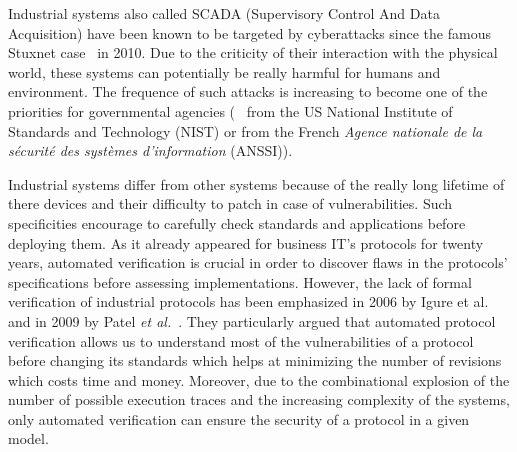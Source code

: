 Industrial systems also called SCADA (Supervisory Control And Data
Acquisition) have been known to be targeted by cyberattacks since the
famous Stuxnet case~\cite{Lan11} in 2010.  Due to the criticity of
their interaction with the physical world, these systems can
potentially be really harmful for humans and environment.  The
frequence of such attacks is increasing to become one of the priorities for
governmental agencies (\eg~\cite{SFS11} from the US National Institute of
Standards and Technology (NIST) or
\cite{ANSSI12_guide_securite_industrielle_en} from the French {\em Agence
nationale de la sécurité des systèmes d'information} (ANSSI)).


Industrial systems differ from other systems because of
the really long lifetime of there devices and their difficulty to
patch in case of vulnerabilities.
Such specificities encourage to carefully check
standards and applications before deploying them.
As it already appeared for business IT's protocols for twenty years,
automated verification is crucial in order to discover flaws in the
protocols' specifications before assessing implementations. However,
the lack of formal verification of industrial protocols has been
emphasized in 2006 by Igure et al.~\cite{ILW06} and in 2009 by
Patel \emph{et al.}~\cite{PBG09}.  They particularly argued that
automated protocol verification allows us to understand most of the
vulnerabilities of a protocol before changing its standards which
helps at minimizing the number of revisions which costs time and
money.  Moreover, due to the combinational explosion of the number of
possible execution traces and the increasing complexity of the
systems, only automated verification can ensure the security of a
protocol in a given model.

